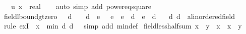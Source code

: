 \begin{isabellebody}
\ \ \ u\ x\ {\isacharcolon}{\kern0pt}{\isacharcolon}{\kern0pt}\ real\isanewline
%
\isadelimproof
\ \ %
\endisadelimproof
%
\isatagproof
{}\isamarkupfalse%
\ {\isacharparenleft}{\kern0pt}auto\ simp\ add{\isacharcolon}{\kern0pt}\ power{}{\isacharunderscore}{\kern0pt}eq{\isacharunderscore}{\kern0pt}square{\isacharparenright}{\kern0pt}%
\endisatagproof
{\isafoldproof}%
%
\isadelimproof
%
\endisadelimproof
%
\isadelimdocument
%
\endisadelimdocument
%
\isatagdocument
%
\isamarkuptrue%
%
\endisatagdocument
{\isafolddocument}%
%
\isadelimdocument
%
\endisadelimdocument
{}\isamarkupfalse%
\ field{\isacharunderscore}{\kern0pt}lbound{\isacharunderscore}{\kern0pt}gt{\isacharunderscore}{\kern0pt}zero{\isacharcolon}{\kern0pt}\ {\isachardoublequoteopen}{}\ {\isacharless}{\kern0pt}\ d{}\ {\isasymLongrightarrow}\ {}\ {\isacharless}{\kern0pt}\ d{}\ {\isasymLongrightarrow}\ {\isasymexists}e{\isachardot}{\kern0pt}\ {}\ {\isacharless}{\kern0pt}\ e\ {\isasymand}\ e\ {\isacharless}{\kern0pt}\ d{}\ {\isasymand}\ e\ {\isacharless}{\kern0pt}\ d{}{\isachardoublequoteclose}\isanewline
\ \ \ d{}\ d{}\ {\isacharcolon}{\kern0pt}{\isacharcolon}{\kern0pt}\ {\isachardoublequoteopen}{\isacharprime}{\kern0pt}a{\isacharcolon}{\kern0pt}{\isacharcolon}{\kern0pt}linordered{\isacharunderscore}{\kern0pt}field{\isachardoublequoteclose}\isanewline
%
\isadelimproof
\ \ %
\endisadelimproof
%
\isatagproof
{}\isamarkupfalse%
\ {\isacharparenleft}{\kern0pt}rule\ exI\ {\isacharbrackleft}{\kern0pt}\ x\ {\isacharequal}{\kern0pt}\ {\isachardoublequoteopen}min\ d{}\ d{}\ {\isacharslash}{\kern0pt}\ {}{\isachardoublequoteclose}{\isacharbrackright}{\kern0pt}{\isacharparenright}{\kern0pt}\ {\isacharparenleft}{\kern0pt}simp\ add{\isacharcolon}{\kern0pt}\ min{\isacharunderscore}{\kern0pt}def{\isacharparenright}{\kern0pt}%
\endisatagproof
{\isafoldproof}%
%
\isadelimproof
\isanewline
%
\endisadelimproof
\isanewline
{}\isamarkupfalse%
\ field{\isacharunderscore}{\kern0pt}less{\isacharunderscore}{\kern0pt}half{\isacharunderscore}{\kern0pt}sum{\isacharcolon}{\kern0pt}\ {\isachardoublequoteopen}x\ {\isacharless}{\kern0pt}\ y\ {\isasymLongrightarrow}\ x\ {\isacharless}{\kern0pt}\ {\isacharparenleft}{\kern0pt}x\ {\isacharplus}{\kern0pt}\ y{\isacharparenright}{\kern0pt}\ {\isacharslash}{\kern0pt}\ {}{\isachardoublequoteclose}\isanewline

\end{isabellebody}
